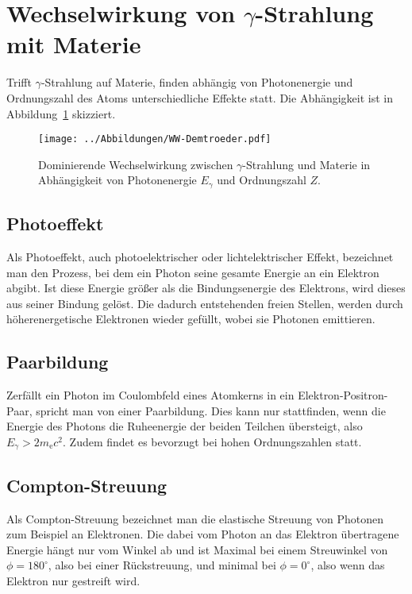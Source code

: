 \section{Wechselwirkung von $\gamma$-Strahlung mit Materie}

Trifft $\gamma$-Strahlung auf Materie, finden abhängig von Photonenergie und
Ordnungszahl des Atoms unterschiedliche Effekte statt. Die Abhängigkeit ist in
Abbildung~\ref{fig:wechselwirkung} skizziert.
\begin{figure}[htbp]
    \centering
    \texttt{[image: ../Abbildungen/WW-Demtroeder.pdf]}
    \caption{%
        Dominierende Wechselwirkung zwischen $\gamma$-Strahlung und Materie in
        Abhängigkeit von Photonenergie $E_\gamma$ und Ordnungszahl
        $Z$.%
    }
    \label{fig:wechselwirkung}
\end{figure}

\subsection{Photoeffekt}

Als Photoeffekt, auch photoelektrischer oder lichtelektrischer Effekt,
bezeichnet man den Prozess, bei dem ein Photon seine gesamte Energie an ein
Elektron abgibt. Ist diese Energie größer als die Bindungsenergie des
Elektrons, wird dieses aus seiner Bindung gelöst. Die dadurch entstehenden
freien Stellen, werden durch höherenergetische Elektronen wieder gefüllt, wobei
sie Photonen emittieren.

\subsection{Paarbildung}

Zerfällt ein Photon im Coulombfeld eines Atomkerns in ein
Elektron-Positron-Paar, spricht man von einer Paarbildung. Dies kann nur
stattfinden, wenn die Energie des Photons die Ruheenergie der beiden Teilchen
übersteigt, also $E_\gamma > 2m_\mathrm{e}c^2$. Zudem findet es bevorzugt bei
hohen Ordnungszahlen statt.

\subsection{Compton-Streuung}

Als Compton-Streuung bezeichnet man die elastische Streuung von Photonen zum
Beispiel an Elektronen. Die dabei vom Photon an das Elektron übertragene
Energie hängt nur vom Winkel ab und ist Maximal bei einem Streuwinkel von $\phi
= 180^\circ$, also bei einer Rückstreuung, und minimal bei $\phi = 0^\circ$,
also wenn das Elektron nur gestreift wird.

